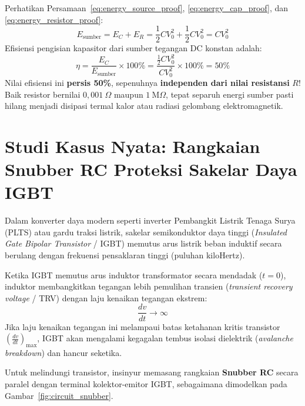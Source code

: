 \documentclass[11pt,a4paper]{article}
\theoremstyle{definition}
\begin{document}
\begin{tcolorbox}[colback=red!5!white,colframe=red!80!black,title=\textbf{Kesimpulan Hukum Konservasi Energi \& Efisiensi 50\%}]
Perhatikan Persamaan~\eqref{eq:energy_source_proof}, \eqref{eq:energy_cap_proof}, dan \eqref{eq:energy_resistor_proof}:
\begin{equation}
    E_{\text{sumber}} = E_C + E_R = \frac{1}{2} C V_0^2 + \frac{1}{2} C V_0^2 = C V_0^2
\end{equation}
Efisiensi pengisian kapasitor dari sumber tegangan DC konstan adalah:
\begin{equation}
    \eta = \frac{E_C}{E_{\text{sumber}}} \times 100\% = \frac{\frac{1}{2} C V_0^2}{C V_0^2} \times 100\% = 50\%
\end{equation}
Nilai efisiensi ini \textbf{persis 50\%}, sepenuhnya \textbf{independen dari nilai resistansi} $R$! Baik resistor bernilai $0{,}001\ \Omega$ maupun $1\ \text{M}\Omega$, tepat separuh energi sumber pasti hilang menjadi disipasi termal kalor atau radiasi gelombang elektromagnetik.
\end{tcolorbox}

\section{Studi Kasus Nyata: Rangkaian Snubber RC Proteksi Sakelar Daya IGBT}

Dalam konverter daya modern seperti inverter Pembangkit Listrik Tenaga Surya (PLTS) atau gardu traksi listrik, sakelar semikonduktor daya tinggi (\textit{Insulated Gate Bipolar Transistor} / IGBT) memutus arus listrik beban induktif secara berulang dengan frekuensi pensaklaran tinggi (puluhan kiloHertz).

Ketika IGBT memutus arus induktor transformator secara mendadak ($t = 0$), induktor membangkitkan tegangan lebih pemulihan transien (\textit{transient recovery voltage} / TRV) dengan laju kenaikan tegangan ekstrem:
\begin{equation}
    \frac{dv}{dt} \to \infty
\end{equation}
Jika laju kenaikan tegangan ini melampaui batas ketahanan kritis transistor $\left(\frac{dv}{dt}\right)_{\text{max}}$, IGBT akan mengalami kegagalan tembus isolasi dielektrik (\textit{avalanche breakdown}) dan hancur seketika.

Untuk melindungi transistor, insinyur memasang rangkaian \textbf{Snubber RC} secara paralel dengan terminal kolektor-emitor IGBT, sebagaimana dimodelkan pada Gambar~\ref{fig:circuit_snubber}.
\end{document}
